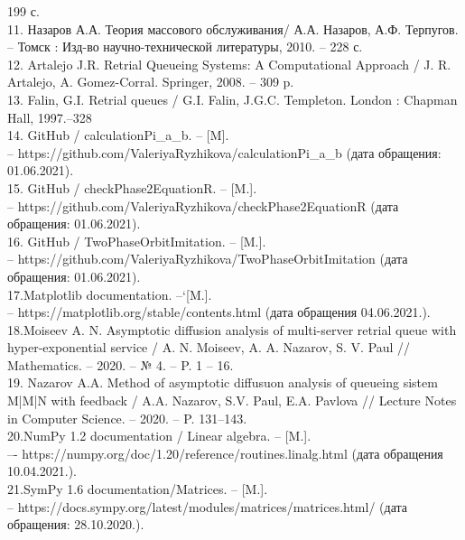 199 с. \\
\hspace*{\parindent}
11. Назаров А.А. Теория массового обслуживания/ А.А. Назаров,
А.Ф. Терпугов. -- Томск : Изд-во научно-технической литературы, 2010. --
228 с. \\
\hspace*{\parindent}
12. Artalejo J.R. Retrial Queueing Systems: A Computational Approach / J. R. Artalejo, A. Gomez-Corral.
Springer, 2008. -- 309 p.\\
\hspace*{\parindent}
13. Falin, G.I. Retrial queues / G.I. Falin, J.G.C. Templeton. London : Chapman Hall, 1997.–328 \\
\hspace*{\parindent}
14. GitHub / calculationPi\_a\_b. -- [M].\\ -- https://github.com/ValeriyaRyzhikova/calculationPi\_a\_b (дата обращения: 01.06.2021).\\
\hspace*{\parindent}
15. GitHub / checkPhase2EquationR. -- [M.].\\ --  https://github.com/ValeriyaRyzhikova/checkPhase2EquationR (дата обращения: 01.06.2021).\\
\hspace*{\parindent}
16. GitHub / TwoPhaseOrbitImitation. -- [M.].\\ -- https://github.com/ValeriyaRyzhikova/TwoPhaseOrbitImitation (дата обращения: 01.06.2021).\\
\hspace*{\parindent}
17.Matplotlib documentation. --`[M.].\\ -- https://matplotlib.org/stable/contents.html  (дата обращения 04.06.2021.).\\
\hspace*{\parindent}
18.Moiseev A. N. Asymptotic diffusion analysis of multi-server retrial queue with hyper-exponential service / A. N. Moiseev, A. A. Nazarov, S. V. Paul // Mathematics. -- 2020. -- № 4. -- P. 1 -- 16.\\
\hspace*{\parindent}
19. Nazarov A.A. Method of asymptotic diffusuon analysis of queueing sistem M|M|N with feedback / A.A. Nazarov, S.V. Paul, E.A. Pavlova // Lecture Notes in Computer Science. -- 2020. -- P. 131--143.\\
\hspace*{\parindent}
20.NumPy 1.2 documentation / Linear algebra. -- [M.].\\ –- https://numpy.org/doc/1.20/reference/routines.linalg.html  (дата обращения 10.04.2021.).\\
\hspace*{\parindent}
21.SymPy 1.6 documentation/Matrices. -- [M.].\\ -- https://docs.sympy.org/latest/modules/matrices/matrices.html/  (дата обращения: 28.10.2020.).\\
\hspace*{\parindent}